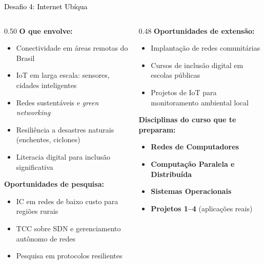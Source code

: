 \documentclass[aspectratio=169]{beamer}
\newcommand{\impt}[1]{\textcolor{morange}{\textbf{#1}}}
\newcommand{\ntc}[1]{\textcolor{mblue}{#1}}
\newcommand{\cc}[1]{\textcolor{mcc}{\textbf{#1}}}
\newcommand{\ia}[1]{\textcolor{mia}{\textbf{#1}}}
\begin{document}
\begin{frame}{\colorbox{dsfnet}{\textcolor{black}{Desafio 4: Internet Ubíqua}}}
  \footnotesize
  \begin{columns}[T]
    \begin{column}{0.50\textwidth}
      \textbf{O que envolve:}
      \begin{itemize}\setlength\itemsep{3pt}
        \item Conectividade em áreas remotas do Brasil
        \item IoT em larga escala: sensores, cidades inteligentes
        \item Redes sustentáveis e \emph{green networking}
        \item Resiliência a desastres naturais (enchentes, ciclones)
        \item Literacia digital para inclusão significativa
      \end{itemize}
      \vspace{0.2cm}
      \textbf{Oportunidades de \impt{pesquisa}:}
      \begin{itemize}\setlength\itemsep{2pt}
        \item IC em redes de baixo custo para regiões rurais
        \item TCC sobre SDN e gerenciamento autônomo de redes
        \item Pesquisa em protocolos resilientes
      \end{itemize}
    \end{column}
    \begin{column}{0.48\textwidth}
      \textbf{Oportunidades de \ntc{extensão}:}
      \begin{itemize}\setlength\itemsep{2pt}
        \item Implantação de redes comunitárias
        \item Cursos de inclusão digital em escolas públicas
        \item Projetos de IoT para monitoramento ambiental local
      \end{itemize}
      \vspace{0.2cm}
      \textbf{Disciplinas do curso que te preparam:}
      \begin{itemize}\setlength\itemsep{2pt}
        \item \cc{Redes de Computadores}
        \item \ia{Computação Paralela e Distribuída}
        \item \cc{Sistemas Operacionais}
        \item \ia{Projetos 1--4} (aplicações reais)
      \end{itemize}
    \end{column}
  \end{columns}
\end{frame}
\end{document}
